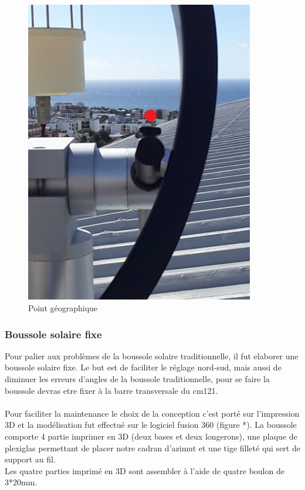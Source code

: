 \documentclass[12pt,a4paper]{article}
\begin{document}
\begin{flushleft}
\begin{figure}[H]
\centering
\includegraphics[width=10cm]{image/montage/6.jpg} 
\caption{Point géographique}
\end{figure}

\subsubsection{Boussole solaire fixe}   

Pour palier aux problèmes de la boussole solaire traditionnelle, il fut elaborer une boussole solaire fixe. Le but est de faciliter le réglage nord-sud, mais aussi de diminuer les erreurs d'angles de la boussole traditionnelle, pour se faire la boussole devras etre fixer à la barre transversale du cm121.\\
~\\
Pour faciliter la maintenance le choix de la conception c'est porté sur l'impression 3D et la modélisation fut effectué sur le logiciel fusion 360 (figure *). La boussole comporte 4 partie imprimer en 3D (deux bases et deux longerons), une plaque de plexiglas permettant de placer notre cadran d'azimut et une tige filleté qui sert de support au fil.\\



Les quatre parties imprimé en 3D sont assembler à l'aide de quatre boulon de 3*20mm.\\


\end{flushleft}
\end{document}
